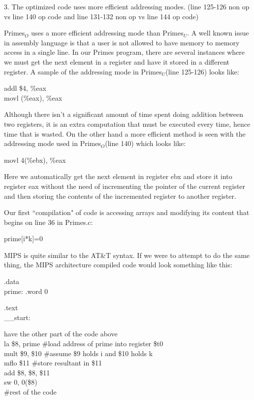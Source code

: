 \documentclass[11pt]{article}
\newenvironment{myindentpar}[1]
{\begin{list}{} 
{\setlength{\leftmargin}{#1}}\item[]}
{\end{list}}
\begin{document}
3. The optimized code uses more efficient addressing modes. (line 125-126 non op vs line 140 op code and line 131-132 non op vs line 144 op code)

Primes$_{O}$ uses a more efficient addressing mode than Primes$_{U}$. A well known issue in assembly language is that a user is not allowed to have memory to memory access in a single line. In our Primes program, there are several instances where we must get the next element in a register and have it stored in a different register. A sample of the addressing mode in Primes$_{U}$(line 125-126) looks like:


\hspace*{2.2in} addl \$4, \%eax \\

\hspace*{2.2in} movl (\%eax), \%eax 


Although there isn't a significant amount of time spent doing addition between two registers, it is an extra computation that must be executed every time, hence time that is wasted. On the other hand a more efficient method is seen with the addressing mode used in Primes$_{O}$(line 140) which looks like: 


\hspace*{2.2in} movl 4(\%ebx), \%eax


Here we automatically get the next element in register ebx and store it into register eax without the need of incrementing the pointer of the current register and then storing the contents of the incremented register to another register.

Our first ``compilation" of code is accessing arrays and modifying its content that begins on line 36 in Primes.c:

\hspace*{2.2 in} prime[i*k]=0

MIPS is quite similar to the AT\&T syntax. If we were to attempt to do the same thing, the MIPS architecture compiled code would look something like this:

.data
\\\hspace*{.4 in}prime: .word 0

.text
\\\_\_start:
\begin{myindentpar}{.4 in}
\#have the other part of the code above
\\la \$8, prime \#load address of prime into register \$t0
\\mult \$9, \$10 \#assume \$9 holds i and \$10 holds k
\\mflo \$11 \#store resultant in \$11
\\add \$8, \$8, \$11
\\sw 0, 0(\$8)\\
\#rest of the code
\end{myindentpar}
\end{document}

